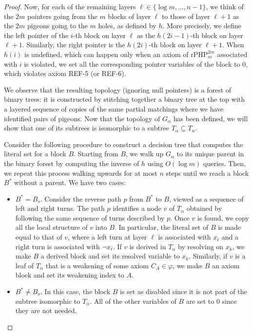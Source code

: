 \begin{proof}
    Now, for each of the remaining layers $\ell \in \{\log m, \ldots, n-1\}$, we think of the $2m$ pointers going from the $m$ blocks of layer $\ell$ to those of layer $\ell+1$ as the $2m$ pigeons going to the $m$ holes, as defined by $h$. More precisely, we define the left pointer of the $i$-th block on layer $\ell$ as the $h(2i-1)$-th block on layer $\ell+1$. Similarly, the right pointer is the $h(2i)$-th block on layer $\ell+1$. When $h(i)$ is undefined, which can happen only when an axiom of $\mathrm{rPHP}_{m}^{2m}$ associated with $i$ is violated, we set all the corresponding pointer variables of the block to $0$, which violates axiom REF-5 (or REF-6).
    
    We observe that the resulting topology (ignoring null pointers) is a forest of binary trees: it is constructed by stitching together a binary tree at the top with a layered sequence of copies of the same partial matchings where we have identified pairs of pigeons. Now that the topology of $G_\alpha$ has been defined, we will show that one of its subtrees is isomorphic to a subtree $T_\alpha \subseteq T_n$.
    
    Consider the following procedure to construct a decision tree that computes the literal set for a block $B$. Starting from $B$, we walk up $G_\alpha$ to its unique parent in the binary forest by computing the inverse of $h$ using $O(\log m)$ queries. Then, we repeat this process walking upwards for at most $n$ steps until we reach a block $B^*$ without a parent. We have two cases:
    \begin{itemize}
        \item $B^* = B_{s}$. Consider the reverse path $p$ from $B^*$ to $B$, viewed as a sequence of left and right turns. The path $p$ identifies a node $v$ of $T_\alpha$ obtained by following the same sequence of turns described by $p$. Once $v$ is found, we copy all the local structure of $v$ into $B$. In particular, the literal set of $B$ is made equal to that of $v$, where a left turn at layer $\ell$ is associated with $x_\ell$ and a right turn is associated with $\lnot x_\ell$. If $v$ is derived in $T_\alpha$ by resolving on $x_k$, we make $B$ a derived block and set its resolved variable to $x_k$. Similarly, if $v$ is a leaf of $T_\alpha$ that is a weakening of some axiom $C_A \in \varphi$, we make $B$ an axiom block and set its weakening index to $A$.
        
        \item $B^* \neq B_{s}$. In this case, the block $B$ is set as disabled since it is not part of the subtree isomorphic to $T_\alpha$. All of the other variables of $B$ are set to 0 since they are not needed.
    \end{itemize}


\end{proof}
